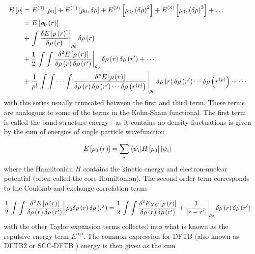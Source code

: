 \begin{equation}
    \begin{split}
    E\left[\rho\right] &= E^{\left(0\right)}\left[\rho_0\right] + E^{\left(1\right)}\left[\rho_0, \delta\rho\right] + E^{\left(2\right)}\left[\rho_0, \left(\delta\rho\right)^2\right] + E^{\left(3\right)}\left[\rho_0, \left(\delta\rho\right)^3\right] + \dots \\
    &= E_{} \left[ \rho_0\left(r\right) \right] \\
    &+ \left. \int \frac{\delta E_{} \left[ \rho\left(r\right) \right]}{\delta \rho\left(r\right)} \right\rvert_{\rho_0}  \delta \rho \left( r \right) \\
    &+ \frac{1}{2} \left. \int\int \frac{\delta^2 E_{} \left[ \rho\left(r\right) \right]}{\delta \rho\left(r\right)\delta \rho\left(r^\prime\right)} \right\rvert_{\rho_0} \delta \rho \left( r \right) \delta \rho \left( r^\prime \right) + \cdots \\
    &+ \frac{1}{p!} \left. \int\int \cdots\int \frac{\delta^p E_{} \left[ \rho\left(r\right) \right]}{\delta \rho\left(r\right)\delta \rho\left(r^\prime\right) \cdots \delta \rho\left(r^{\left(p\right)}\right)} \right\rvert_{\rho_0} \delta \rho \left( r \right) \delta \rho \left( r^\prime \right) \cdots \delta \rho\left(r^{\left(p\right)}\right) + \cdots
    \end{split}
\end{equation}
%
with this series usually truncated between the first and third term\cite{Gaus2011, Koskinen2009}. 
These terms are analogous to some of the terms in the Kohn-Sham functional. The 
first term is called the band-structure energy - as it contains no density fluctuations
is given by the sum of energies of single particle wavefunction

\begin{equation}
    E_{} \left[ \rho_0\left(r\right) \right] =  \sum_i \braket{\psi_i|H_{} \left[ \rho_0 \right]|\psi_i}
\end{equation}
%
where the Hamiltonian $H$ contains the kinetic energy and electron-nuclear potential
(often called the core Hamiltonian). The second order term corresponds to the Coulomb 
and exchange-correlation terms

\begin{equation}
    \frac{1}{2} \left. \int\int \frac{\delta^2 E_{} \left[ \rho\left(r\right) \right]}{\delta \rho\left(r\right)\delta \rho\left(r^\prime\right)} \right\rvert {\rho_0} \delta \rho \left( r \right) \delta \rho \left( r^\prime \right) = \frac{1}{2} \left. \int\int \frac{\delta^2 E_{XC} \left[ \rho\left(r\right) \right]}{\delta \rho\left(r\right)\delta \rho\left(r^\prime\right)} + \frac{1}{\left\lvert r-r^\prime \right\rvert} \right\rvert_{\rho_0} \delta \rho \left( r \right) \delta \rho \left( r^\prime \right)
\end{equation}
%
with the other Taylor expansion terms collected into what is known as the repulsive
energy term $E^\text{rep}$. The common expression for DFTB (also known as DFTB2
or SCC-DFTB \cite{Elstner1998}) energy is then given as the sum

